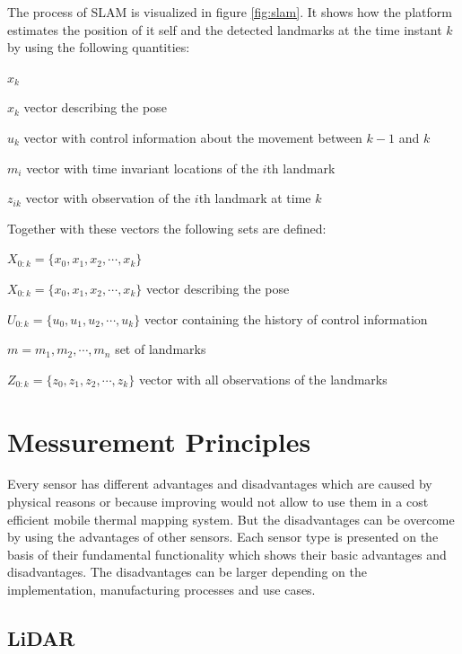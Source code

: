 The process of \ac{SLAM} is visualized in figure \ref{fig:slam}.
It shows how the platform estimates the position of it self and the detected landmarks at the time instant $k$ by using the following quantities\cite{durrant-Whyte2006}:

\begin{labeling}{$x_k$}
	\item[\boldmath$x_k$] vector describing the pose
	\item[\boldmath$u_k$] vector with control information about the movement between $k-1$ and $k$
	\item[\boldmath$m_i$] vector with time invariant locations of the $i$th landmark
	\item[\boldmath$z_{ik}$] vector with observation of the $i$th landmark at time $k$
\end{labeling}

Together with these vectors the following sets are defined:

\begin{labeling}{\boldmath$X_{0:k}=\{x_0, x_1, x_2, \cdots , x_k\}$}
	\item[\boldmath$X_{0:k}=\{x_0, x_1, x_2, \cdots , x_k\}$] vector describing the pose
	\item[\boldmath$U_{0:k}=\{u_0, u_1, u_2, \cdots , u_k\}$] vector containing the history of control information
	\item[\boldmath$m={m_1, m_2, \cdots, m_n}$] set of landmarks
	\item[\boldmath$Z_{0:k}=\{z_0, z_1, z_2, \cdots , z_k\}$] vector with all observations of the landmarks
\end{labeling}


\section{Messurement Principles}\label{sec:messurementPrinciples}
Every sensor has different advantages and disadvantages which are caused by physical reasons or because improving would not allow to use them in a cost efficient mobile thermal mapping system.
But the disadvantages can be overcome by using the advantages of other sensors.
Each sensor type is presented on the basis of their fundamental functionality which shows their basic advantages and disadvantages.
The disadvantages can be larger depending on the implementation, manufacturing processes and use cases.

\subsection{LiDAR}\label{ssec:lidar}

